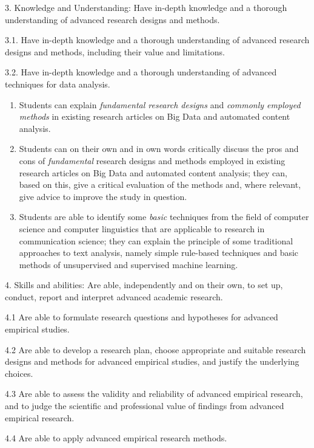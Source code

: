 {\footnotesize{
3. Knowledge and Understanding: Have in-depth knowledge and a thorough understanding of advanced research designs and methods.


3.1. Have in-depth knowledge and a thorough understanding of advanced research designs and methods, including their value and limitations.


3.2. Have in-depth knowledge and a thorough understanding of advanced techniques for data analysis.

}}

\begin{enumerate}[A]
\item Students can explain \emph{fundamental research designs} and \emph{commonly employed methods} in existing research articles on Big Data and automated content analysis.
\item Students can on their own and in own words critically discuss the pros and cons of \emph{fundamental} research designs and methods employed in existing research articles on Big Data and automated content analysis; they can, based on this, give a critical evaluation of the methods and, where relevant, give advice to improve the study in question.
\item Students are able to identify some \emph{basic} techniques from the field of computer science and computer linguistics that are applicable to research in communication science; they can explain the principle of some traditional approaches to text analysis, namely simple rule-based techniques and basic methods of unsupervised and supervised machine learning.
\end{enumerate}

{\footnotesize{
4. Skills and abilities: Are able, independently and on their own, to set up, conduct, report and interpret advanced academic research.

4.1 Are able to formulate research questions and hypotheses for advanced empirical studies.


4.2 Are able to develop a research plan, choose appropriate and suitable research designs and methods for advanced empirical studies, and justify the underlying choices.


4.3 Are able to assess the validity and reliability of advanced empirical research, and to judge the scientific and professional value of findings from advanced empirical research.


4.4 Are able to apply advanced empirical research methods.

}}


